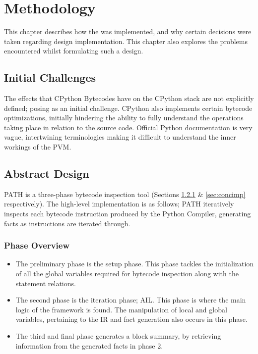 \chapter{Methodology}
    \par This chapter describes how the  was implemented, and why certain decisions were taken regarding design implementation. This chapter also explores the problems encountered whilst formulating such a design.
    \section{Initial Challenges}
    \par The effects that CPython Bytecodes have on the CPython stack are not explicitly defined; posing as an initial challenge. CPython also implements certain bytecode optimizations, initially hindering the ability to fully understand
    the operations taking place in relation to the source code. Official Python documentation is very vague, intertwining terminologies making it difficult to understand the inner workings of the \acs{PVM}.
    \section{Abstract Design}
    \par PATH is a three-phase bytecode inspection tool (Sections \ref{subsec:phaseoverview} \& \ref{sec:concimp} respectively). The high-level implementation is as follows; 
    PATH iteratively inspects each bytecode instruction produced by the Python Compiler, generating facts as instructions are iterated through. 
        \subsection{Phase Overview}
        \label{subsec:phaseoverview}
        \begin{itemize}
            \item[1.] The preliminary phase is the setup phase. This phase tackles the initialization of all the global variables required for bytecode inspection along with the statement relations.
            \item[2.] The second phase is the iteration phase; \acs{AIL}. This phase is where the main logic of the framework is found. The manipulation of local and global variables, pertaining to the IR and fact generation also occurs in this phase.
            \item[3.] The third and final phase generates a block summary, by retrieving information from the generated facts in phase 2.   
        \end{itemize}
        
